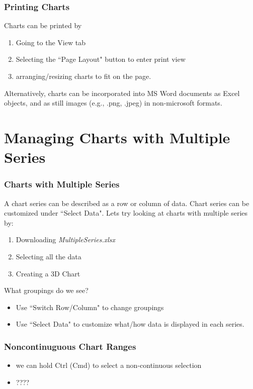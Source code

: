 \documentclass[12pt]{beamer}
\begin{document}
	\begin{frame}
		\frametitle{Printing Charts}
		Charts can be printed by
		\begin{enumerate}
			\item Going to the View tab
			\item Selecting the ``Page Layout" button to enter print view
			\item arranging/resizing charts to fit on the page.
		\end{enumerate}
			Alternatively, charts can be incorporated into MS Word documents as Excel objects, and as still images (e.g., .png, .jpeg) in non-microsoft formats.
	\end{frame}
	
\section{Managing Charts with Multiple Series}
	\begin{frame}
		\frametitle{Charts with Multiple Series}
		A chart series can be described as a row or column of data.
		Chart series can be customized under ``Select Data".
		Lets try looking at charts with multiple series by:
		\begin{enumerate}
			\item Downloading \textit{MultipleSeries.xlsx}
			\item Selecting all the data
			\item Creating a 3D Chart
		\end{enumerate}
	What groupings do we see?
	\begin{itemize}
		\item Use ``Switch Row/Column" to change groupings
		\item Use ``Select Data" to customize what/how data is displayed in each series. 
	\end{itemize}
	\end{frame}

	\begin{frame}
		\frametitle{Noncontinuguous Chart Ranges}
		\begin{itemize}
			\item we can hold Ctrl (Cmd) to select a non-continuous selection
			\item ????
		\end{itemize} 
	\end{frame}
\end{document}
